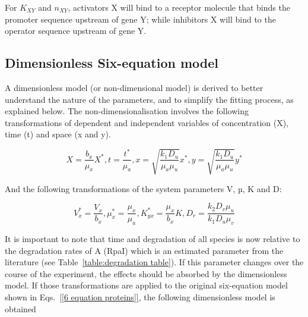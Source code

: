 For $K_{XY}$ and $n_{XY}$, activators X will bind to a receptor molecule that binds the promoter sequence upstream of gene Y; while inhibitors X will bind to the operator sequence upstream of gene Y.



\subsection{Dimensionless Six-equation model}

A dimensionless model (or non-dimensional model) is derived to better understand the nature of the parameters, and to simplify the fitting process, as explained below.
The non-dimensionalisation involves the following transformations of dependent and independent variables of concentration (X), time (t) and space (x and y).


\begin{equation}\label{variable transformations}
    X = \frac{b_{x}}{\mu_{x}}X^*, t = \frac{t^*}{\mu_{a}},
    x = \sqrt{\frac{k_{1}D_{u}}{\mu_{a}\mu_{u}}}x^*, y = \sqrt{\frac{k_{1}D_{u}}{\mu_{a}\mu_{u}}}y^*
\end{equation}

And the following transformations of the system parameters V, µ, K and D:

\begin{equation}\label{parameter transformations}
    V_{x}^*=\frac{V_{x}}{b_{x}},  \mu_{x}^* = \frac{\mu_{x}}{\mu_{a}}, K^*_{yx} = \frac{\mu_{x}}{b_{x}}K ,D_{r} = \frac{k_{2}D_{v}\mu_{u}}{k_{1}D_{u}\mu_{v}}
\end{equation}

It is important to note that time and degradation of all species is now relative to the degradation rates of A (RpaI) which is an estimated parameter from the literature (see Table~\ref{table:degradation table}).
If this parameter changes over the course of the experiment, the effects should be absorbed by the dimensionless model.
If those transformations are applied to the original six-equation model shown in Eqs.~\ref{[6 equation proteins]}, the following dimensionless model is obtained

